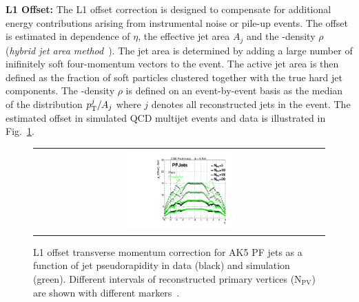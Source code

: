 \begin{description}
 \item \textbf{L1 Offset:} The L1 offset correction is designed to compensate for additional energy contributions arising from instrumental noise or pile-up events. The \pt offset is estimated in dependence of $\eta$, the effective jet area $A_j$ and the \pt-density $\rho$ (\textit{hybrid jet area method}~\cite{Cacciari2008119}). The jet area is determined by adding a large number of inifinitely soft four-momentum vectors to the event. The active jet area is then defined as the fraction of soft particles clustered together with the true hard jet components. The \pt-density $\rho$ is defined on an event-by-event basis as the median of the distribution $p_{\text{T}}^{j}/A_{j}$ where $j$ denotes all reconstructed jets in the event. The estimated offset in simulated QCD multijet events and data is illustrated in Fig.~\ref{fig:l1offset}.
\begin{figure}[!h]
  \centering 
  \begin{tabular}{c}
    \includegraphics[width=0.4\textwidth]{figures/OffsetVsEta_NPV_PF5_data53_vs_mc53.pdf} 
  \end{tabular}
  \caption{L1 offset transverse momentum correction for AK5 PF jets as a function of jet pseudorapidity in data (black) and simulation (green). Different intervals of reconstructed primary vertices ($\mathrm{N_{PV}}$) are shown with different markers~\cite{CMS-DP-2013-033}.}
  \label{fig:l1offset}
\end{figure}


\end{description}
